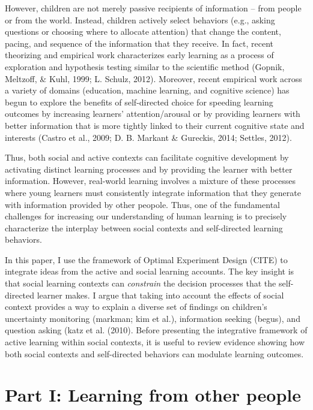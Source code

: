 \documentclass[a4paper,man,apacite,floatsintext]{apa6}
\begin{document}
However, children are not merely passive recipients of information --
from people or from the world. Instead, children actively select
behaviors (e.g., asking questions or choosing where to allocate
attention) that change the content, pacing, and sequence of the
information that they receive. In fact, recent theorizing and empirical
work characterizes early learning as a process of exploration and
hypothesis testing similar to the scientific method (Gopnik, Meltzoff,
\& Kuhl, 1999; L. Schulz, 2012). Moreover, recent empirical work across
a variety of domains (education, machine learning, and cognitive
science) has begun to explore the benefits of self-directed choice for
speeding learning outcomes by increasing learners' attention/arousal or
by providing learners with better information that is more tightly
linked to their current cognitive state and interests (Castro et al.,
2009; D. B. Markant \& Gureckis, 2014; Settles, 2012).

Thus, both social and active contexts can facilitate cognitive
development by activating distinct learning processes and by providing
the learner with better information. However, real-world learning
involves a mixture of these processes where young learners must
consistently integrate information that they generate with information
provided by other peopole. Thus, one of the fundamental challenges for
increasing our understanding of human learning is to precisely
characterize the interplay between social contexts and self-directed
learning behaviors.

In this paper, I use the framework of Optimal Experiment Design (CITE)
to integrate ideas from the active and social learning accounts. The key
insight is that social learning contexts can \emph{constrain} the
decision processes that the self-directed learner makes. I argue that
taking into account the effects of social context provides a way to
explain a diverse set of findings on children's uncertainty monitoring
(markman; kim et al.), information seeking (begus), and question asking
(katz et al. (2010). Before presenting the integrative framework of
active learning within social contexts, it is useful to review evidence
showing how both social contexts and self-directed behaviors can
modulate learning outcomes.

\section{Part I: Learning from other
people}\label{part-i-learning-from-other-people}
\end{document}
